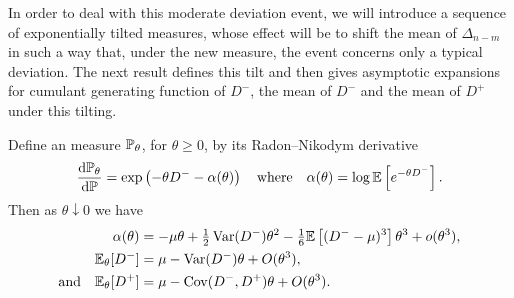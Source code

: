 In order to deal with this moderate deviation event, we will introduce a sequence of exponentially tilted measures, whose effect will be to shift the mean of $\Delta_{n-m}$ in such a way that, under the new measure, the event concerns only a typical deviation. The next result defines this tilt and then gives asymptotic expansions for cumulant generating function of $D^-$, the mean of $D^-$ and the mean of $D^+$ under this tilting. 
\begin{lemma}
    \label{lem:asym-expansions}
    Define an measure $\P_{\theta}$, for $\theta \geq 0$, by its Radon--Nikodym derivative
    \begin{equation*}
        \diff{\P_{\theta}}{\P} = \exp\left( - \theta D^- - \alpha(\theta) \right)
        \quad \text{where} \quad
        \alpha(\theta) = \log \E \left[ e^{-\theta D^-} \right].
    \end{equation*}
    Then as $\theta \downarrow 0$ we have
    \begin{align*}
        \alpha(\theta) &= -\mu \theta + \tfrac{1}{2}\var(D^-) \theta^2 - \tfrac{1}{6} \E \left[ (D^- - \mu)^3 \right] \theta^3 + \littleo(\theta^3), \\
        \E_{\theta}[D^-] &= \mu - \var(D^-) \theta + \bigo(\theta^3), \\
        \text{and} \quad \E_{\theta}[D^+] &= \mu - \cov(D^-, D^+) \theta + \bigo(\theta^3).
    \end{align*}
\end{lemma}
